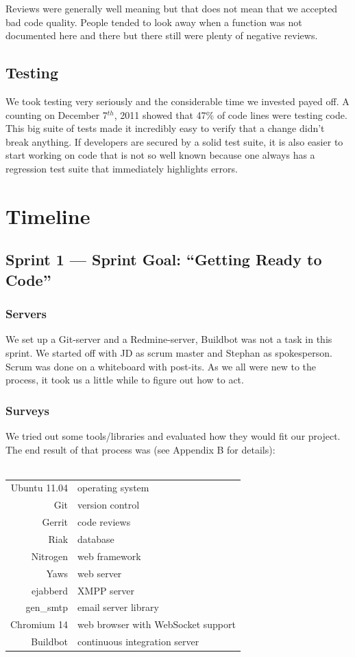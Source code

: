 \documentclass[11pt,a4paper]{report}
\begin{document}
Reviews were generally well meaning but that does not mean that we accepted bad
code quality. People tended to look away when a function was not documented here
and there but there still were plenty of negative reviews.
\subsection*{Testing}
We took testing very seriously and the considerable time we invested payed off.
A counting on December 7$^{th}$, 2011 showed that 47\% of code lines were
testing code. This big suite of tests made it incredibly easy to verify that a
change didn't break anything. If developers are secured by a solid test suite,
it is also easier to start working on code that is not so well known because one
always has a regression test suite that immediately highlights errors.

\section{Timeline}
\subsection*{Sprint 1 --- Sprint Goal: ``Getting Ready to Code''}
\subsubsection{Servers}
We set up a Git-server and a Redmine-server, Buildbot was not
a task in this sprint. We started off with JD as scrum master and Stephan as
spokesperson. Scrum was done on a whiteboard with post-its.
As we all were new to the process, it took us a little while to figure out how
to act.
\subsubsection{Surveys}
We tried out some tools/libraries and evaluated how they would fit
our project. The end result of that process was (see Appendix B for details): \\
\\
\begin{tabular}{r|l}
Ubuntu 11.04 & operating system                                   \\
Git          & version control                                    \\
Gerrit       & code reviews                                       \\
Riak         & database                                           \\
Nitrogen     & web framework                                      \\
Yaws         & web server                                         \\
ejabberd     & XMPP server                                        \\
gen\_smtp    & email server library                               \\
Chromium 14  & web browser with WebSocket\cite{websocket} support \\
Buildbot     & continuous integration server
\end{tabular}
\end{document}
